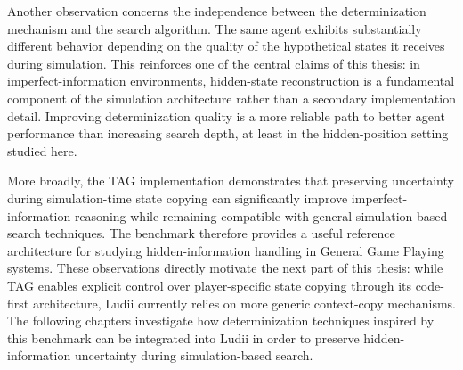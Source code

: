 Another observation concerns the independence between the determinization mechanism and the search algorithm. The same agent exhibits substantially different behavior depending on the quality of the hypothetical states it receives during simulation. This reinforces one of the central claims of this thesis: in imperfect-information environments, hidden-state reconstruction is a fundamental component of the simulation architecture rather than a secondary implementation detail. Improving determinization quality is a more reliable path to better agent performance than increasing search depth, at least in the hidden-position setting studied here.

More broadly, the TAG implementation demonstrates that preserving uncertainty during simulation-time state copying can significantly improve imperfect-information reasoning while remaining compatible with general simulation-based search techniques. The benchmark therefore provides a useful reference architecture for studying hidden-information handling in General Game Playing systems. These observations directly motivate the next part of this thesis: while TAG enables explicit control over player-specific state copying through its code-first architecture, Ludii currently relies on more generic context-copy mechanisms. The following chapters investigate how determinization techniques inspired by this benchmark can be integrated into Ludii in order to preserve hidden-information uncertainty during simulation-based search.